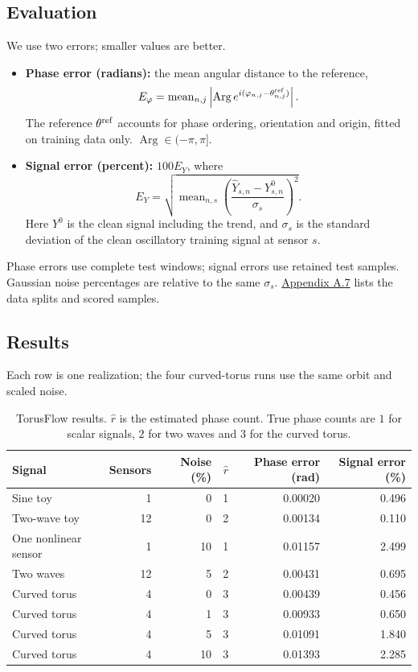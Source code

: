 \documentclass[11pt,a4paper]{article}
\begin{document}
\subsection*{Evaluation}
We use two errors; smaller values are better.
\begin{itemize}
\item \textbf{Phase error (radians):} the mean angular distance to the reference,
\[
E_\varphi=\operatorname{mean}_{n,j}
\left|\operatorname{Arg}e^{i(\varphi_{n,j}-\theta^{\rm ref}_{n,j})}\right|.
\]
The reference $\theta^{\rm ref}$ accounts for phase ordering, orientation
and origin, fitted on training data only. $\operatorname{Arg}\in(-\pi,\pi]$.
\item \textbf{Signal error (percent):} $100E_Y$, where
\[
E_Y=\sqrt{\operatorname{mean}_{n,s}
\left(\frac{\widehat Y_{s,n}-Y^0_{s,n}}{\sigma_s}\right)^2}.
\]
Here $Y^0$ is the clean signal including the trend, and $\sigma_s$ is the
standard deviation of the clean oscillatory training signal at sensor $s$.
\end{itemize}
Phase errors use complete test windows; signal errors use retained test
samples. Gaussian noise percentages are relative to the same $\sigma_s$.
\hyperref[app:evaluation]{Appendix A.7} lists the data splits and scored samples.

\subsection*{Results}
Each row is one realization; the four curved-torus runs use the same
orbit and scaled noise.

\begin{table}[H]
\centering\small
\setlength{\tabcolsep}{6pt}
\begin{tabular}{lrrrrr}
\toprule
Signal & Sensors & Noise (\%) & $\widehat r$ & Phase error (rad) & Signal error (\%) \\
\midrule
Sine toy & 1 & 0 & 1 & 0.00020 & 0.496 \\
Two-wave toy & 12 & 0 & 2 & 0.00134 & 0.110 \\
One nonlinear sensor & 1 & 10 & 1 & 0.01157 & 2.499 \\
Two waves & 12 & 5 & 2 & 0.00431 & 0.695 \\
Curved torus & 4 & 0 & 3 & 0.00439 & 0.456 \\
Curved torus & 4 & 1 & 3 & 0.00933 & 0.650 \\
Curved torus & 4 & 5 & 3 & 0.01091 & 1.840 \\
Curved torus & 4 & 10 & 3 & 0.01393 & 2.285 \\
\bottomrule
\end{tabular}
\caption{TorusFlow results. $\widehat r$ is the estimated phase count.
True phase counts are $1$ for scalar signals, $2$ for two waves and $3$
for the curved torus.}
\label{tab:experiment-results}
\end{table}
\end{document}
